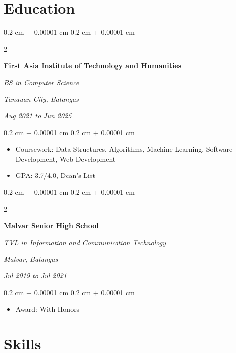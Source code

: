 \documentclass[10pt, letterpaper]{article}
\newenvironment{highlights}{
    \begin{itemize}[
        topsep=0.10 cm,
        parsep=0.10 cm,
        partopsep=0pt,
        itemsep=0pt,
        leftmargin=0.4 cm + 10pt
    ]
}{
    \end{itemize}
} %
\newenvironment{onecolentry}{
    \begin{adjustwidth}{
        0.2 cm + 0.00001 cm
    }{
        0.2 cm + 0.00001 cm
    }
}{
    \end{adjustwidth}
} %
\newenvironment{twocolentry}[2][]{
    \onecolentry
    \def\secondColumn{#2}
    \setcolumnwidth{\fill, 4.5 cm}
    \begin{paracol}{2}
}{
    \switchcolumn \raggedleft \secondColumn
    \end{paracol}
    \endonecolentry
} %
\begin{document}
    
    \section{Education}



        
        \begin{twocolentry}{
        \textit{Tanauan City, Batangas}    
            
        \textit{Aug 2021 to Jun 2025}}
            \textbf{First Asia Institute of Technology and Humanities}

            \textit{BS in Computer Science}
        \end{twocolentry}

        \vspace{0.10 cm}
        \begin{onecolentry}
            \begin{highlights}
                \item Coursework: Data Structures, Algorithms, Machine Learning, Software Development, Web Development
                \item GPA: 3.7/4.0, Dean's List
            \end{highlights}
        \end{onecolentry}


        \vspace{0.2 cm}

        \begin{twocolentry}{
        \textit{Malvar, Batangas}    
            
        \textit{Jul 2019 to Jul 2021}}
            \textbf{Malvar Senior High School}

            \textit{TVL in Information and Communication Technology}
        \end{twocolentry}

        \vspace{0.10 cm}
        \begin{onecolentry}
            \begin{highlights}
                \item Award: With Honors
            \end{highlights}
        \end{onecolentry}



    
    \section{Skills}
\end{document}

